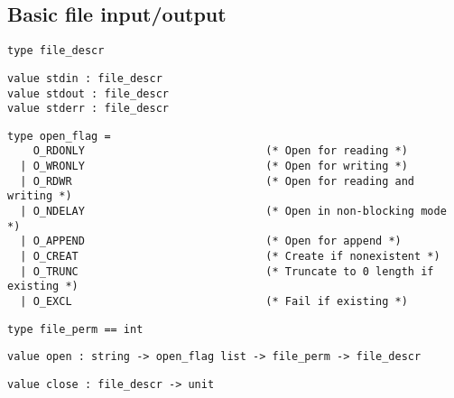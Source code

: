 \subsection*{Basic file input/output }\begin{verbatim}
type file_descr
\end{verbatim}
\begin{comment}
 The abstract type of file descriptors. 
\end{comment}
\begin{verbatim}
value stdin : file_descr
value stdout : file_descr
value stderr : file_descr
\end{verbatim}
%
%
%
\begin{comment}
 File descriptors for standard input, standard output and
           standard error. 
\end{comment}
\begin{verbatim}
type open_flag =
    O_RDONLY                            (* Open for reading *)
  | O_WRONLY                            (* Open for writing *)
  | O_RDWR                              (* Open for reading and writing *)
  | O_NDELAY                            (* Open in non-blocking mode *)
  | O_APPEND                            (* Open for append *)
  | O_CREAT                             (* Create if nonexistent *)
  | O_TRUNC                             (* Truncate to 0 length if existing *)
  | O_EXCL                              (* Fail if existing *)
\end{verbatim}
\begin{comment}
 The flags to \verbopen. 
\end{comment}
\begin{verbatim}
type file_perm == int
\end{verbatim}
\begin{comment}
 The type of file access rights. 
\end{comment}
\begin{verbatim}
value open : string -> open_flag list -> file_perm -> file_descr
\end{verbatim}
%
\begin{comment}
 Open the named file with the given flags. Third argument is
           the permissions to give to the file if it is created. Return
           a file descriptor on the named file. 
\end{comment}
\begin{verbatim}
value close : file_descr -> unit
\end{verbatim}

